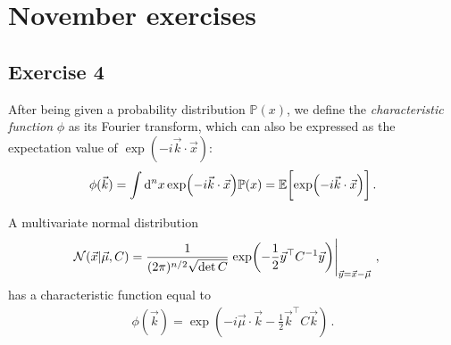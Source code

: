 \documentclass[main.tex]{subfiles}
\begin{document}
\section{November exercises}

\subsection*{Exercise 4}


After being given a probability distribution \(\mathbb{P}(x)\), we define the \emph{characteristic function} \(\phi \) as its Fourier transform, which can also be expressed as the expectation value of \(\exp(- i \vec{k} \cdot \vec{x})\): 
%
\begin{align}
\phi (\vec{k}) = \int \dd[n]{x} \exp(- i \vec{k} \cdot \vec{x}) \mathbb{P}(x) 
= \mathbb{E} \qty[ \exp(- i \vec{k} \cdot \vec{x})]
\,.
\end{align}

\begin{claim}
A multivariate normal distribution 
%
\begin{align}
\mathcal{N}(\vec{x} | \vec{\mu}, C)
&= \frac{1}{(2\pi )^{n/2} \sqrt{\det C}} \eval{\exp(- \frac{1}{2} \vec{y}^{\top} C^{-1} \vec{y})}_{\vec{y} = \vec{x} - \vec{\mu}}
\,,
\end{align}
%
has a characteristic function equal to 
%
\begin{align}
\phi (\vec{k}) = \exp(- i \vec{\mu}\cdot \vec{k} - \frac{1}{2} \vec{k}^{\top} C \vec{k}) 
\,.
\end{align}
\end{claim}
\end{document}

